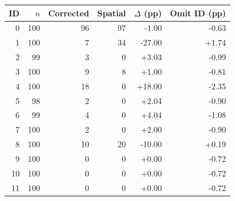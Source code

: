 \begin{tabular}{rrrrrr}
\hline
ID & $n$ & Corrected & Spatial & $\Delta$ (pp) & Omit ID (pp) \\
\hline
0 & 100 & 96 & 97 & -1.00 & -0.63 \\
1 & 100 & 7 & 34 & -27.00 & +1.74 \\
2 & 99 & 3 & 0 & +3.03 & -0.99 \\
3 & 100 & 9 & 8 & +1.00 & -0.81 \\
4 & 100 & 18 & 0 & +18.00 & -2.35 \\
5 & 98 & 2 & 0 & +2.04 & -0.90 \\
6 & 99 & 4 & 0 & +4.04 & -1.08 \\
7 & 100 & 2 & 0 & +2.00 & -0.90 \\
8 & 100 & 10 & 20 & -10.00 & +0.19 \\
9 & 100 & 0 & 0 & +0.00 & -0.72 \\
10 & 100 & 0 & 0 & +0.00 & -0.72 \\
11 & 100 & 0 & 0 & +0.00 & -0.72 \\
\hline
\end{tabular}
